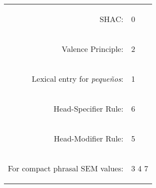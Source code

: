 \documentclass[12pt]{article}
\begin{document}
\begin{tabular}{rl}
\begin{avm}SHAC:\end{avm} & \begin{avm}\@0\end{avm}\\
\begin{avm}Valence Principle:\end{avm} & \begin{avm}\@2\end{avm}\\
\begin{avm}Lexical entry for \textit{peque\~nos}:\end{avm} & \begin{avm}\@1\end{avm}\\
\begin{avm}Head-Specifier Rule:\end{avm} & \begin{avm}\@6\end{avm}\\
\begin{avm}Head-Modifier Rule:\end{avm} & \begin{avm}\@5\end{avm}\\
\begin{avm}For compact phrasal SEM values:\end{avm} & \begin{avm}\@3 \@4 \@7\end{avm}\\
\end{tabular}
\end{document}
